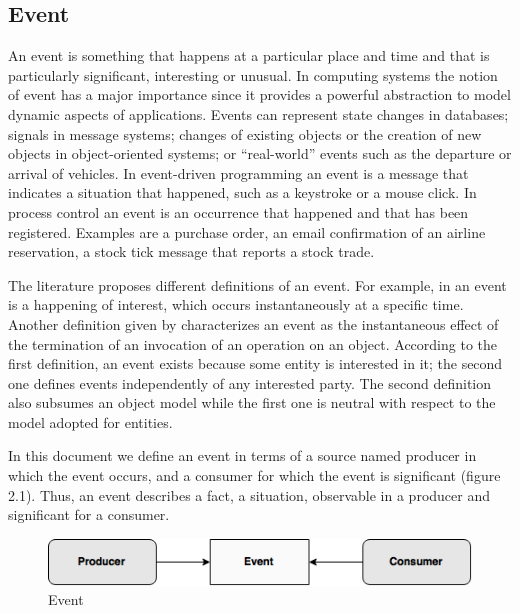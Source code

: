  \subsection{Event}
 An event is something that happens at a particular place and time and that is particularly significant, interesting or unusual. In computing systems the notion of event has a major importance since it provides a powerful abstraction to model dynamic aspects of applications. Events can represent state changes in databases; signals in message systems; changes of existing objects or the creation of new objects in object-oriented systems; or “real-world” events such as the departure or arrival of vehicles. In event-driven programming an event is a message that indicates a situation that happened, such as a keystroke or a mouse click. In process control an event is an occurrence that happened and that has been registered.  Examples are a purchase order, an email confirmation of an airline reservation, a stock tick message that reports a stock trade.
 
 The literature proposes different definitions of an event. For example, in \cite{Mansouri97gem} an event is a happening of interest, which occurs instantaneously at a specific time. Another definition given by \cite{Rosenblum97} characterizes an event as the instantaneous effect of the termination of an invocation of an operation on an object. According to the first definition, an event exists because some entity is interested in it; the second one defines events independently of any interested party. The second definition also subsumes an object model while the first one is neutral with respect to the model adopted for entities. 

In this document we define an event in terms of a source named producer in which the event occurs, and a consumer for which the event is significant (figure 2.1). Thus, an event describes a fact, a situation, observable in a producer and significant for a consumer.
\begin{figure}[H]
  \begin{center}
    \includegraphics[scale=0.65]{chap3/images/event.png}
  \end{center}
  \caption{Event}
  \label{fig:event}
\end{figure}
